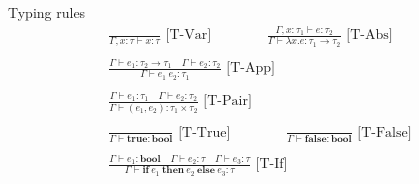\documentclass{beamer}
\newcommand{\Abs}[2]{\lambda #1.#2}
\newcommand{\App}[2]{#1\ #2}
\newcommand{\Pair}[2]{\left(#1, #2\right)}
\newcommand{\BTrue}{\mathbf{true}}
\newcommand{\BFalse}{\mathbf{false}}
\newcommand{\ITE}[3]{\mathbf{if}\ #1\ \mathbf{then}\ #2\ \mathbf{else}\ #3}
\newcommand{\TBool}{\mathbf{bool}}
\newcommand{\TFun}[2]{#1 \to #2}
\newcommand{\TPair}[2]{#1 \times #2}
\newcommand{\Rule}[3]{\frac{#2}{#3}\text{\ [#1]}}
\newcommand{\Judge}[3][\Gamma]{#1 \vdash #2 : #3}
\begin{document}
\begin{frame}{Typing rules}
			\vspace{-2em}
			\begin{gather*}
				\Rule{T-Var}
					 {}
					 {\Judge[\Gamma, x : \tau]{x}{\tau}}
				\quad\quad\quad\quad
				\Rule{T-Abs}
					 {\Judge[\Gamma, x : \tau_1]{e}{\tau_2}}
					 {\Judge{\Abs{x}{e}}{\TFun{\tau_1}{\tau_2}}}
				\\\\
				\Rule{T-App}
				     {\Judge{e_1}{\TFun{\tau_2}{\tau_1}}\quad\Judge{e_2}{\tau_2}}
				     {\Judge{\App{e_1}{e_2}}{\tau_1}}
				\\\\
				\Rule{T-Pair}
				     {\Judge{e_1}{\tau_1}\quad\Judge{e_2}{\tau_2}}
				     {\Judge{\Pair{e_1}{e_2}}{\TPair{\tau_1}{\tau_2}}}
			    \\\\
			    \Rule{T-True}
			    	 {}
			    	 {\Judge{\BTrue}{\TBool}}
			    \quad\quad\quad\quad
			    \Rule{T-False}
			    	 {}
			    	 {\Judge{\BFalse}{\TBool}}
			   	\\\\
			   	\Rule{T-If}
			   		 {\Judge{e_1}{\TBool}\quad\Judge{e_2}{\tau}\quad\Judge{e_3}{\tau}}
			   		 {\Judge{\ITE{e_1}{e_2}{e_3}}{\tau}}
			\end{gather*}
\end{frame}
\end{document}
